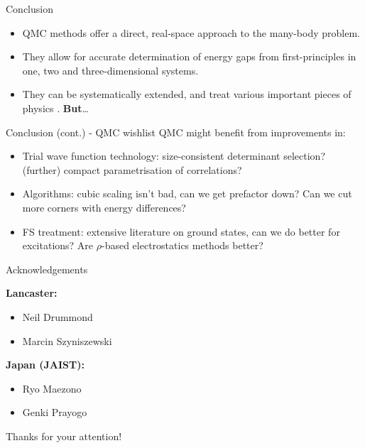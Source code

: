 \documentclass[12pt, pdf, hyperref={draft}, usenames, dvipsnames]{beamer}
\newcommand{\green}[1]{{\bf\color{ForestGreen}{#1}}}
\begin{document}
\begin{frame}{Conclusion}
\begin{itemize}
  \item QMC methods offer a direct, real-space approach to the many-body problem.
  \item They allow for accurate determination of energy gaps from
  first-principles in one, two and three-dimensional systems.
  \item They can be systematically extended, and treat various important pieces
  of physics \green{exactly}. {\bf But}\ldots
\end{itemize}
\end{frame}

\begin{frame}{Conclusion (cont.) - QMC wishlist}
  QMC might benefit from improvements in:
  \begin{itemize}
    \item Trial wave function technology: size-consistent determinant
    selection? (further) compact parametrisation of correlations?
    \item Algorithms: cubic scaling isn't bad, can we get prefactor
    down? Can we cut more corners with energy differences?
    \item FS treatment: extensive literature on ground states, can we do better
    for excitations? Are $\rho$-based electrostatics methods better?
  \end{itemize}
\end{frame}


\begin{frame}{Acknowledgements}

\begin{minipage}[t]{0.45\textwidth}
{\bf Lancaster:}
\begin{itemize}
  \item Neil Drummond
  \item Marcin Szyniszewski
\end{itemize}
\end{minipage}%
\hfill
\begin{minipage}[t]{0.45\textwidth}
{\bf Japan (JAIST):}
\begin{itemize}
  \item Ryo Maezono
  \item Genki Prayogo
\end{itemize}
\end{minipage}%
\pause
\vfill
\begin{center}
{\Large Thanks for your attention!}
\end{center}
\end{frame}
\end{document}
